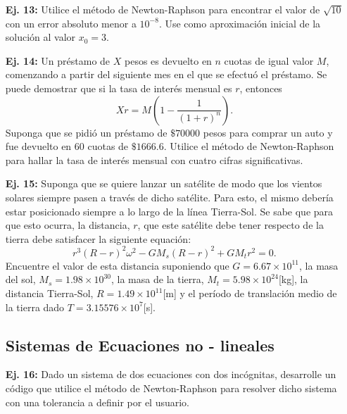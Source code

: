 \documentclass[11pt]{article}
\begin{document}
\begin{itemize}
\item[{\bf Ej. 13:}] Utilice el m\'etodo de Newton-Raphson para encontrar el valor de $\sqrt{10}$ con un error absoluto menor a $10^{-8}$. Use como aproximaci\'on inicial de la soluci\'on al valor $x_0=3.$

\item[{\bf Ej. 14:}] Un pr\'estamo de $X$ pesos es devuelto en $n$ cuotas de igual valor $M$, comenzando a partir del siguiente mes en el que se efectu\'o el pr\'estamo. Se puede demostrar que si la tasa de inter\'es mensual es $r$, entonces
\begin{equation}
 Xr=M(1-\frac{1}{(1+r)^n}).
\end{equation}
Suponga que se pidi\'o un pr\'estamo de $\$70000$ pesos para comprar un auto y fue devuelto en 60 cuotas de $\$1666.6$. Utilice el m\'etodo de Newton-Raphson para hallar la tasa de inter\'es mensual con cuatro cifras significativas.

\item[{\bf Ej. 15:}] Suponga que se quiere lanzar un sat\'elite de modo que los vientos solares siempre pasen a trav\'es de dicho sat\'elite. Para esto, el mismo deber\'ia estar posicionado  siempre a lo largo de la l\'inea Tierra-Sol. Se sabe que para que esto ocurra, la distancia, $r$, que este sat\'elite debe tener respecto de la tierra debe satisfacer la siguiente equaci\'on:
\begin{equation}
 r^3(R-r)^2\omega^2-GM_s(R-r)^2+GM_tr^2 = 0.
\end{equation}Encuentre el valor de esta distancia suponiendo que $G=6.67 \times 10^{11}$, la masa del sol, $M_s=1.98\times10^{30}$, la masa de la tierra, $M_t=5.98\times10^{24}$[kg], la distancia Tierra-Sol, $R=1.49 \times 10^{11}$[m] y el per\'iodo de translaci\'on medio de la tierra dado $T=3.15576\times10^7$[s].

\subsection*{Sistemas de Ecuaciones no - lineales}

\item[{\bf Ej. 16:}] Dado un sistema de dos ecuaciones con dos inc\'ognitas, desarrolle un c\'odigo que utilice el m\'etodo de Newton-Raphson para resolver dicho sistema con una tolerancia a definir por el usuario.


\end{itemize}
\end{document}
